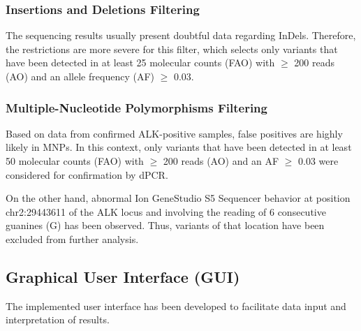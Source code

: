 \subsubsection{Insertions and Deletions Filtering}

The sequencing results usually present doubtful data regarding InDels. Therefore, the restrictions are more severe for this filter, which selects only variants that have been detected in at least 25 molecular counts (FAO) with $\ge$ 200 reads (AO) and an allele frequency (AF) $\ge$ 0.03.

\subsubsection{Multiple-Nucleotide Polymorphisms Filtering}

Based on data from confirmed ALK-positive samples, false positives are highly likely in MNPs. In this context, only variants that have been detected in at least 50 molecular counts (FAO) with $\ge$ 200 reads (AO) and an AF $\ge$ 0.03 were considered for confirmation by dPCR. 

On the other hand, abnormal Ion GeneStudio\texttrademark{} S5 Sequencer behavior at position chr2:29443611 of the ALK locus and involving the reading of 6 consecutive guanines (G) has been observed. Thus, variants of that location have been excluded from further analysis.

\subsection{Graphical User Interface (GUI)}

The implemented user interface has been developed to facilitate data input and interpretation of results.

